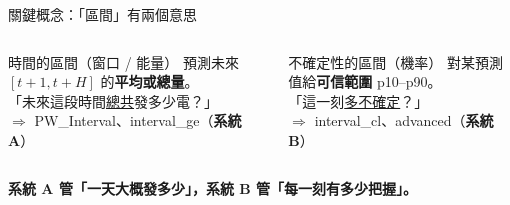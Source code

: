 \documentclass[aspectratio=169,11pt]{beamer}
\begin{document}
\begin{frame}{關鍵概念：「區間」有兩個意思}
  \begin{columns}[T]
      \begin{block}{時間的區間（窗口 / 能量）}
      預測未來 $[t{+}1,t{+}H]$ 的\textbf{平均或總量}。\\
      「未來這段時間\underline{總共}發多少電？」\\[3pt]
      $\Rightarrow$ PW\_Interval、interval\_ge（\textbf{系統 A}）
      \end{block}
      \begin{block}{不確定性的區間（機率）}
      對某預測值給\textbf{可信範圍} p10–p90。\\
      「這一刻\underline{多不確定}？」\\[3pt]
      $\Rightarrow$ interval\_cl、advanced（\textbf{系統 B}）
      \end{block}
  \end{columns}
  \vspace{6pt}
  \centering
  \textbf{系統 A 管「一天大概發多少」，系統 B 管「每一刻有多少把握」。}
\end{frame}

\end{document}

